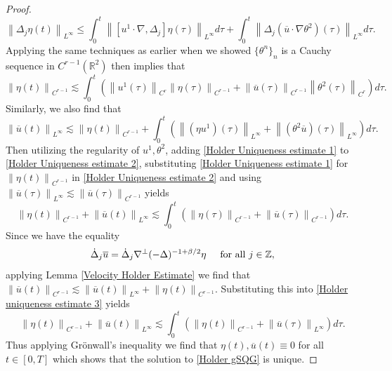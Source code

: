 \documentclass[12pt,xcolor=svgnames]{amsart}
\newcommand{\R}{\mathbb{R}}
\newcommand{\norm}[2]{\left\lVert#1\right\rVert_{#2}}
\begin{document}
\begin{proof}
$$
\norm{\Delta_j\eta(t)}{L^{\infty}} \leq \int_0^t \norm{[u^1\cdot\nabla,\Delta_j]\eta(\tau)}{L^{\infty}}d\tau + \int_0^t \norm{\Delta_j(\overline{u}\cdot \nabla \theta^2)(\tau)}{L^{\infty}}d\tau.
$$
Applying the same techniques as earlier when we showed $\{\theta^n\}_n$ is a Cauchy sequence in $C^{r-1}(\R^2)$ then implies that 
\begin{equation}
\label{Holder Uniqueness estimate 1}
\norm{\eta(t)}{C^{r-1}} \lesssim \int_0^t \left( \norm{u^1(\tau)}{C^r}\norm{\eta(\tau)}{C^{r-1}} + \norm{\overline{u}(\tau)}{C^{r-1}}\norm{\theta^2(\tau)}{C^r}\right)d\tau.
\end{equation}
Similarly, we also find that 
\begin{equation}
\label{Holder Uniqueness estimate 2}
\norm{\overline{u}(t)}{L^{\infty}} \lesssim \norm{\eta(t)}{C^{r-1}} + \int_0^t \left( \norm{(\eta u^1)(\tau)}{L^{\infty}} + \norm{(\theta^2\overline{u})(\tau)}{L^{\infty}}\right)d\tau.
\end{equation}
Then utilizing the regularity of $u^1,\theta^2$, adding \eqref{Holder Uniqueness estimate 1} to \eqref{Holder Uniqueness estimate 2}, substituting \eqref{Holder Uniqueness estimate 1} for $\norm{\eta(t)}{C^{r-1}}$ in \eqref{Holder Uniqueness estimate 2} and using $\norm{\overline{u}(\tau)}{L^{\infty}} \lesssim \norm{\overline{u}(\tau)}{C^{r-1}}$ yields
\begin{equation}
\label{Holder uniqueness estimate 3}
\norm{\eta(t)}{C^{r-1}} + \norm{\overline{u}(t)}{L^{\infty}} \lesssim \int_0^t \left(\norm{\eta(\tau)}{C^{r-1}} + \norm{\overline{u}(\tau)}{C^{r-1}}\right)d\tau.
\end{equation}
Since we have the equality 
$$
\dot{\Delta}_j \overline{u} = \dot{\Delta}_j \nabla^{\perp}(-\Delta)^{-1+\beta/2}\eta \hspace{.5cm} \text{for all } j \in \mathbb{Z},
$$
applying Lemma \ref{Velocity Holder Estimate}  we find that $\norm{\overline{u}(t)}{C^{r-1}} \lesssim  \norm{\overline{u}(t)}{L^{\infty}} + \norm{\eta(t)}{C^{r-1}}$. Substituting this into \eqref{Holder uniqueness estimate 3} yields
\begin{equation}
\label{Holder uniqueness estimate 4}
\norm{\eta(t)}{C^{r-1}} + \norm{\overline{u}(t)}{L^{\infty}} \lesssim \int_0^t \left(\norm{\eta(t)}{C^{r-1}} + \norm{\overline{u}(\tau)}{L^{\infty}}\right)d\tau.
\end{equation}
Thus applying Grönwall's inequality we find that $\eta(t), \overline{u}(t) \equiv 0$ for all $t\in [0,T]$ which shows that the solution to \eqref{Holder gSQG} is unique.
\end{proof}
\end{document}
